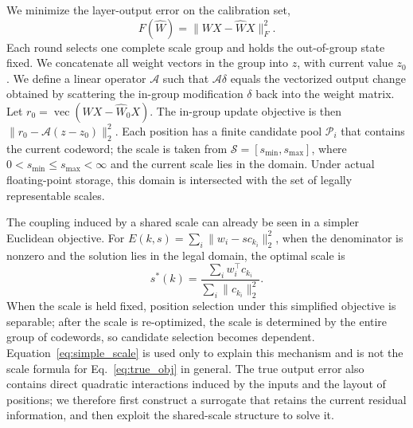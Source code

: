 We minimize the layer-output error on the calibration set,
\begin{equation}
F(\widehat W)=\|WX-\widehat W X\|_F^2.
\label{eq:true_obj}
\end{equation}
Each round selects one complete scale group and holds the out-of-group state fixed.
We concatenate all weight vectors in the group into $z$, with current value $z_0$.
We define a linear operator $\mathcal A$ such that $\mathcal A\delta$ equals the vectorized output change obtained by scattering the in-group modification $\delta$ back into the weight matrix.
Let $r_0=\operatorname{vec}(WX-\widehat W_0X)$.
The in-group update objective is then $\|r_0-\mathcal A(z-z_0)\|_2^2$.
Each position has a finite candidate pool $\mathcal P_i$ that contains the current codeword; the scale is taken from $\mathcal S=[s_{\min},s_{\max}]$, where $0<s_{\min}\le s_{\max}<\infty$ and the current scale lies in the domain.
Under actual floating-point storage, this domain is intersected with the set of legally representable scales.

The coupling induced by a shared scale can already be seen in a simpler Euclidean objective.
For $E(k,s)=\sum_i\|w_i-sc_{k_i}\|_2^2$, when the denominator is nonzero and the solution lies in the legal domain, the optimal scale is
\begin{equation}
s^*(k)=\frac{\sum_i w_i^\top c_{k_i}}{\sum_i\|c_{k_i}\|_2^2}.
\label{eq:simple_scale}
\end{equation}
When the scale is held fixed, position selection under this simplified objective is separable; after the scale is re-optimized, the scale is determined by the entire group of codewords, so candidate selection becomes dependent.
Equation~\eqref{eq:simple_scale} is used only to explain this mechanism and is not the scale formula for Eq.~\eqref{eq:true_obj} in general.
The true output error also contains direct quadratic interactions induced by the inputs and the layout of positions; we therefore first construct a surrogate that retains the current residual information, and then exploit the shared-scale structure to solve it.
